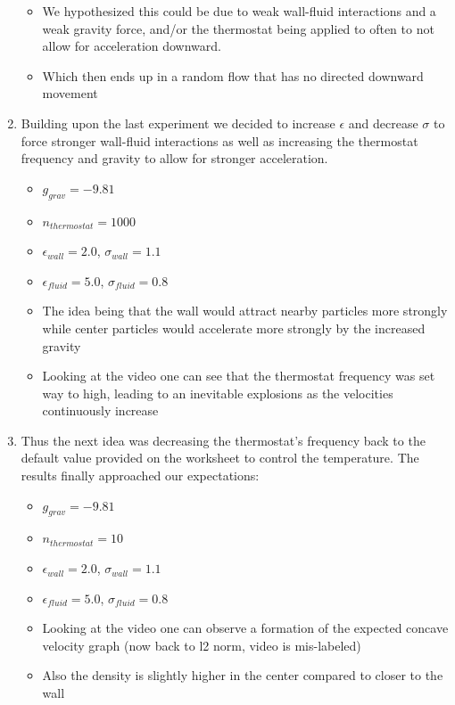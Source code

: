 \documentclass{article}
\begin{document}
\begin{enumerate}
\begin{itemize}
            \item We hypothesized this could be due to weak wall-fluid interactions and a weak gravity force, and/or the thermostat being applied to often to not allow for acceleration downward.
            \item Which then ends up in a random flow that has no directed downward movement
        \end{itemize}
        \item Building upon the last experiment we decided to increase $\epsilon$ and decrease $\sigma$ to force stronger wall-fluid interactions as well as increasing the thermostat frequency and gravity to allow for stronger acceleration.
        \begin{itemize}
            \item $g_{grav} = -9.81$
            \item $n_{thermostat} = 1000$
            \item $\epsilon_{wall} = 2.0$, $\sigma_{wall} = 1.1$
            \item $\epsilon_{fluid} = 5.0$, $\sigma_{fluid} = 0.8$
            \item The idea being that the wall would attract nearby particles more strongly while center particles would accelerate more strongly by the increased gravity
            \item Looking at the video one can see that the thermostat frequency was set way to high, leading to an inevitable explosions as the velocities continuously increase
        \end{itemize}
        \item Thus the next idea was decreasing the thermostat's frequency back to the default value provided on the worksheet to control the temperature. The results finally approached our expectations:
        \begin{itemize}
            \item $g_{grav} = -9.81$
            \item $n_{thermostat} = 10$
            \item $\epsilon_{wall} = 2.0$, $\sigma_{wall} = 1.1$
            \item $\epsilon_{fluid} = 5.0$, $\sigma_{fluid} = 0.8$
            \item Looking at the video one can observe a formation of the expected concave velocity graph (now back to l2 norm, video is mis-labeled)
            \item Also the density is slightly higher in the center compared to closer to the wall

\end{itemize}
\end{enumerate}
\end{document}
